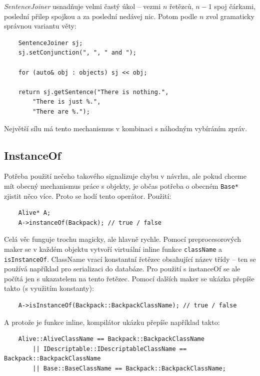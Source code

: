 \documentclass[11pt, a4paper]{article}
\def\class#1{\emph{#1}}
\begin{document}
\class{SentenceJoiner} usnadňuje velmi častý úkol -- vezmi $n$ řetězců, $n-1$ spoj čárkami, poslední přilep spojkou  a za poslední nedávej nic. Potom podle $n$ zvol gramaticky správnou variantu věty:
\begin{lstlisting}
	SentenceJoiner sj;
	sj.setConjunction(", ", " and ");
	
	for (auto& obj : objects) sj << obj;
	
	return sj.getSentence("There is nothing.", 
		"There is just %.", 
		"There are %.");
\end{lstlisting}


\noindent Největší sílu má tento mechanismus v kombinaci s náhodným vybíráním zpráv.

\subsection{InstanceOf}

Potřeba použití nečeho takového signalizuje chybu v návrhu, ale pokud chceme mít obecný mechanismus práce s objekty, je občas potřeba o obecném \texttt{Base*} zjistit něco více. Proto se hodí tento operátor. Použití:

\begin{lstlisting}
	Alive* A;
	A->instanceOf(Backpack); // true / false
\end{lstlisting}

\noindent Celá věc funguje trochu magicky, ale hlavně rychle. Pomocí preprocesorových maker se v každém objektu vytvoří virtuální inline funkce \texttt{className} a \texttt{isInstanceOf}. ClassName vrací konstantní řetězec obsahující název třídy -- ten se používá například pro serializaci do databáze. Pro použití s instanceOf se ale počítá jen s ukazatelem na tento řetězec. Pomocí dalších maker se ukázka přepíše takto (s využitím konstanty):

\begin{lstlisting}
	A->isInstanceOf(Backpack::BackpackClassName); // true / false
\end{lstlisting}

\noindent A protože je funkce inline, kompilátor ukázku přepíše například takto:

\begin{lstlisting}
	Alive::AliveClassName == Backpack::BackpackClassName 
		|| IDescriptable::IDescriptableClassName == Backpack::BackpackClassName 
		|| Base::BaseClassName == Backpack::BackpackClassName;
\end{lstlisting}
\end{document}
